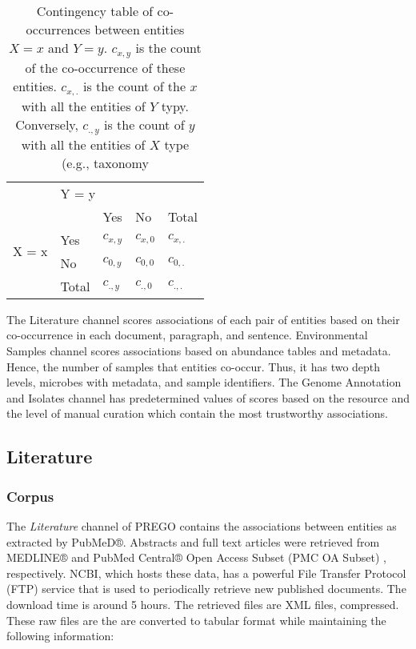 \begin{table}[ht]
   \centering
   \begin{tabular}{c|llll}
    & \multicolumn{4}{l}{Y = y} \\ \cline{2-5} 
   \multirow{4}{*}{X = x} &  & Yes & No & Total \\ \cline{3-5} 
    & \multicolumn{1}{l|}{Yes} & $c_{x,y}$ & $c_{x,0}$ & $c_{x,.}$ \\
    & \multicolumn{1}{l|}{No} & $c_{0,y}$ & $c_{0,0}$ & $c_{0,.}$ \\
    & \multicolumn{1}{l|}{Total} & $c_{.,y}$ & $c_{.,0}$ & $c_{.,.}$
   \end{tabular}
   \caption[PREGO contingency table between two terms]{Contingency table of co-occurrences between entities $X = x$ and $Y = y$. 
   $c_{x,y}$ is the count of the
co-occurrence of these entities. $c_{x,.}$ is the count of the $x$ with all the
entities of $Y$ typy. Conversely, $c_{.,y}$ is the count of $y$ with all the entities of $X$ type (e.g., taxonomy}
   \label{table:pregoA1}
\end{table}

The Literature channel scores associations of each pair of entities based on their co-occurrence in each document, paragraph, and sentence.
Environmental Samples channel scores associations based on abundance tables and metadata. Hence, the number of samples that entities co-occur. 
Thus, it has two depth levels, microbes with metadata, and sample identifiers.
The Genome Annotation and Isolates channel has predetermined values of scores
based on the resource and the level of manual curation which contain the most trustworthy associations. 

   \subsection{Literature}
   \label{subsec:prego-tm}

   \subsubsection{Corpus}
The \textit{Literature} channel of PREGO contains the associations between 
entities as extracted by PubMeD®. Abstracts and full text articles were retrieved
from MEDLINE® and PubMed Central® Open Access Subset (PMC OA Subset) \parencite{sayers2021database}, respectively. 
NCBI, which hosts these data, has a powerful File Transfer Protocol (FTP) service 
that is used to periodically retrieve new published documents. The download time 
is around 5 hours.
The retrieved files are XML files, compressed. These raw files are the are converted
to tabular format while maintaining the following information:

